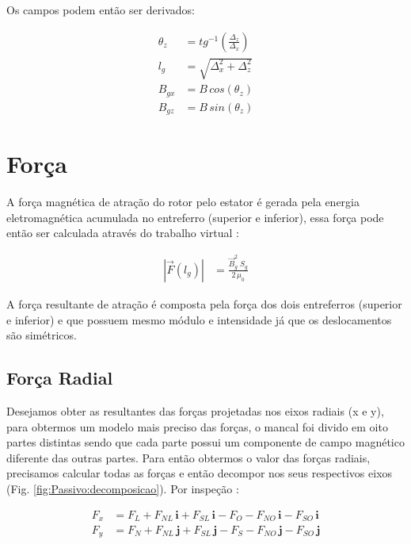 Os campos podem então ser derivados:

\begin{align}
\theta_z &= tg^{-1}(\frac{\Delta_z}{\Delta_x}) \\
l_g &= \sqrt{\Delta_x^2 + \Delta_z^2} \\
B_{gx} &= B \, cos(\theta_z) \\
B_{gz} &= B \, sin(\theta_z) 
\end{align}


\section{Força}

A força magnética de atração do rotor pelo estator é gerada pela energia eletromagnética acumulada no entreferro (superior e inferior), essa força pode então ser calculada através do trabalho virtual \citep{Chiba}:

\begin{align}
|\vec{F}(l_g)| &=  \frac{ \vec{B}_{g}^2 \; S_g}{2 \, \mu_0} \label{eq:passivo:Fx}
\end{align}

A força resultante de atração é composta pela força dos dois entreferros (superior e inferior) e que possuem mesmo módulo e intensidade já que os deslocamentos são simétricos. 

\subsection{Força Radial} \label{subsection:forca:x}


Desejamos obter as resultantes das forças projetadas nos eixos radiais (x e y), para obtermos um modelo mais preciso das forças, o mancal foi divido em oito partes distintas sendo que cada parte possui um componente de campo magnético diferente das outras partes. Para então obtermos o valor das forças radiais, precisamos calcular todas as forças e então decompor nos seus respectivos eixos (Fig. \ref{fig:Passivo:decomposicao}). Por inspeção :

\begin{align}
F_x &= F_{L} + F_{NL} \, \boldsymbol{i} + F_{SL} \, \boldsymbol{i} - F_{O} - F_{NO} \, \boldsymbol{i}  - F_{SO} \, \boldsymbol{i} \label{eq:p:F:resultante:x} \\
F_y &= F_{N} + F_{NL} \, \boldsymbol{j} + F_{SL} \, \boldsymbol{j} - F_{S} - F_{NO} \, \boldsymbol{j}  - F_{SO} \, \boldsymbol{j}
\label{eq:p:F:resultante:y} 
\end{align}

